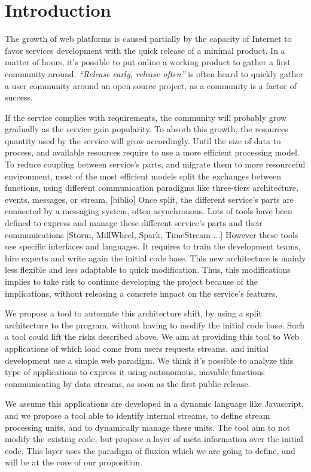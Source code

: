 \section{Introduction}


The growth of web platforms is caused partially by the capacity of Internet to favor services development with the quick release of a minimal product.
In a matter of hours, it's possible to put online a working product to gather a first community around.
\textit{``Release early, release often''} is often heard to quickly gather a user community around an open source project, as a community is a factor of success.

If the service complies with requirements, the community will probably grow gradually as the service gain popularity.
To absorb this growth, the resources quantity used by the service will grow accordingly.
Until the size of data to process, and available resources require to use a more efficient processing model.
To reduce coupling between service's parts, and migrate them to more resourceful environment, most of the most efficient models split the exchanges between functions, using different communication paradigms like three-tiers architecture, events, messages, or stream. [biblio]
Once split, the different service's parts are connected by a messaging system, often asynchronous.
Lots of tools have been defined to express and manage these different service's parts and their communications [Storm, MillWheel, Spark, TimeStream ...]
However these tools use specific interfaces and languages.
It requires to train the development teams, hire experts and write again the initial code base.
This new architecture is mainly less flexible and less adaptable to quick modification.
Thus, this modifications implies to take risk to continue developing the project because of the implications, without releasing a concrete impact on the service's features.

We propose a tool to automate this architecture shift, by using a split architecture to the program, without having to modify the initial code base.
Such a tool could lift the risks described above.
We aim at providing this tool to Web applications of which load come from users requests streams, and initial development use a simple web paradigm.
We think it's possible to analyze this type of applications to express it using autonomous, movable functions communicating by data streams, as soon as the first public release.

We assume this applications are developed in a dynamic language like Javascript, and we propose a tool able to identify internal streams, to define stream processing units, and to dynamically manage these units.
The tool aim to not modify the existing code, but propose a layer of meta information over the initial code.
This layer uses the paradigm of fluxion which we are going to define, and will be at the core of our proposition.

